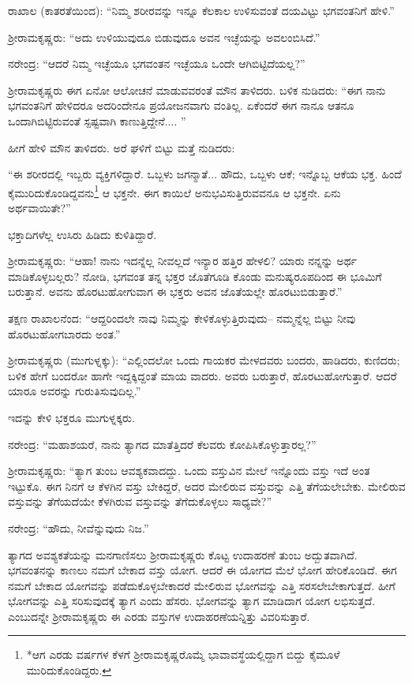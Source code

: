 ರಾಖಾಲ (ಕಾತರತೆಯಿಂದ): “ನಿಮ್ಮ ಶರೀರವನ್ನು ಇನ್ನೂ ಕೆಲಕಾಲ ಉಳಿಸುವಂತೆ ದಯವಿಟ್ಟು ಭಗವಂತನಿಗೆ ಹೇಳಿ.”

ಶ್ರೀರಾಮಕೃಷ್ಣರು: “ಅದು ಉಳಿಯುವುದೂ ಬಿಡುವುದೂ ಅವನ ಇಚ್ಛೆಯನ್ನು ಅವಲಂಬಿಸಿದೆ.”

ನರೇಂದ್ರ: “ಆದರೆ ನಿಮ್ಮ ಇಚ್ಛೆಯೂ ಭಗವಂತನ ಇಚ್ಛೆಯೂ ಒಂದೇ ಆಗಿಬಿಟ್ಟಿದೆಯಲ್ಲ?”

ಶ್ರೀರಾಮಕೃಷ್ಣರು ಈಗ ಏನೋ ಆಲೋಚನೆ ಮಾಡುವವರಂತೆ ಮೌನ ತಾಳಿದರು. ಬಳಿಕ ನುಡಿದರು: “ಈಗ ನಾನು ಭಗವಂತನಿಗೆ ಹೇಳಿದರೂ ಅದರಿಂದೇನೂ ಪ್ರಯೋಜನವಾಗು ವಂತಿಲ್ಲ. ಏಕೆಂದರೆ ಈಗ ನಾನೂ ಆತನೂ ಒಂದಾಗಿಬಿಟ್ಟಿರುವಂತೆ ಸ್ಪಷ್ಟವಾಗಿ ಕಾಣುತ್ತಿದ್ದೇನೆ.... ”

ಹೀಗೆ ಹೇಳಿ ಮೌನ ತಾಳಿದರು. ಅರೆ ಘಳಿಗೆ ಬಿಟ್ಟು ಮತ್ತೆ ನುಡಿದರು:

“ಈ ಶರೀರದಲ್ಲಿ ಇಬ್ಬರು ವ್ಯಕ್ತಿಗಳಿದ್ದಾರೆ. ಒಬ್ಬಳು ಜಗನ್ಮಾತೆ... ಹೌದು, ಒಬ್ಬಳು ಆಕೆ; ಇನ್ನೊಬ್ಬ ಆಕೆಯ ಭಕ್ತ. ಹಿಂದೆ ಕೈಮುರಿದುಕೊಂಡಿದ್ದವನು\footnote{*ಆಗ ಎರಡು ವರ್ಷಗಳ ಕೆಳಗೆ ಶ್ರೀರಾಮಕೃಷ್ಣರೊಮ್ಮೆ ಭಾವಾವಸ್ಥೆಯಲ್ಲಿದ್ದಾಗ ಬಿದ್ದು ಕೈಮೂಳೆ ಮುರಿದುಕೊಂಡಿದ್ದರು.} ಆ ಭಕ್ತನೇ. ಈಗ ಕಾಯಿಲೆ ಅನುಭವಿಸುತ್ತಿರುವವನೂ ಆ ಭಕ್ತನೇ. ಏನು ಅರ್ಥವಾಯಿತೇ?”

ಭಕ್ತಾದಿಗಳೆಲ್ಲ ಉಸಿರು ಹಿಡಿದು ಕುಳಿತಿದ್ದಾರೆ.

ಶ್ರೀರಾಮಕೃಷ್ಣರು: “ಆಹಾ! ನಾನು ಇದನ್ನೆಲ್ಲ ನೀವಲ್ಲದೆ ಇನ್ಯಾರ ಹತ್ತಿರ ಹೇಳಲಿ? ಯಾರು ನನ್ನನ್ನು ಅರ್ಥ ಮಾಡಿಕೊಳ್ಳಬಲ್ಲರು? ನೋಡಿ, ಭಗವಂತ ತನ್ನ ಭಕ್ತರ ಜೊತೆಗೂಡಿ ಕೊಂಡು ಮನುಷ್ಯರೂಪದಿಂದ ಈ ಭೂಮಿಗೆ ಬರುತ್ತಾನೆ. ಅವನು ಹೊರಟುಹೋಗುವಾಗ ಈ ಭಕ್ತರು ಅವನ ಜೊತೆಯಲ್ಲೇ ಹೊರಟುಬಿಡುತ್ತಾರೆ.”

ತಕ್ಷಣ ರಾಖಾಲನೆಂದ: “ಆದ್ದರಿಂದಲೇ ನಾವು ನಿಮ್ಮನ್ನು ಕೇಳಿಕೊಳ್ಳುತ್ತಿರುವುದು– ನಮ್ಮನ್ನೆಲ್ಲ ಬಿಟ್ಟು ನೀವು ಹೊರಟುಹೋಗಬಾರದು ಅಂತ.”

ಶ್ರೀರಾಮಕೃಷ್ಣರು (ಮುಗುಳ್ನಕ್ಕು): “ಎಲ್ಲಿಂದಲೋ ಒಂದು ಗಾಯಕರ ಮೇಳದವರು ಬಂದರು, ಹಾಡಿದರು, ಕುಣಿದರು; ಬಳಿಕ ಹೇಗೆ ಬಂದರೋ ಹಾಗೇ ಇದ್ದಕ್ಕಿದ್ದಂತೆ ಮಾಯ ವಾದರು. ಅವರು ಬರುತ್ತಾರೆ, ಹೊರಟುಹೋಗುತ್ತಾರೆ. ಆದರೆ ಯಾರೂ ಅವರನ್ನು ಗುರುತಿಸುವುದಿಲ್ಲ.”

ಇದನ್ನು ಕೇಳಿ ಭಕ್ತರೂ ಮುಗುಳ್ನಕ್ಕರು.

ನರೇಂದ್ರ: “ಮಹಾಶಯರೆ, ನಾನು ತ್ಯಾಗದ ಮಾತೆತ್ತಿದರೆ ಕೆಲವರು ಕೋಪಿಸಿಕೊಳ್ಳುತ್ತಾರಲ್ಲ?”

ಶ್ರೀರಾಮಕೃಷ್ಣರು: “ತ್ಯಾಗ ತುಂಬ ಆವಶ್ಯಕವಾದದ್ದು. ಒಂದು ವಸ್ತುವಿನ ಮೇಲೆ ಇನ್ನೊಂದು ವಸ್ತು ಇದೆ ಅಂತ ಇಟ್ಟುಕೊ. ಈಗ ನಿನಗೆ ಆ ಕೆಳಗಿನ ವಸ್ತು ಬೇಕಿದ್ದರೆ, ಅದರ ಮೇಲಿರುವ ವಸ್ತುವನ್ನು ಎತ್ತಿ ತೆಗೆಯಲೇಬೇಕು. ಮೇಲಿರುವ ವಸ್ತುವನ್ನು ತೆಗೆಯದೆಯೇ ಕೆಳಗಿರುವ ವಸ್ತುವನ್ನು ತೆಗೆದುಕೊಳ್ಳಲು ಸಾಧ್ಯವೇ?”

ನರೇಂದ್ರ: “ಹೌದು, ನೀವೆನ್ನುವುದು ನಿಜ.”

ತ್ಯಾಗದ ಅವಶ್ಯಕತೆಯನ್ನು ಮನಗಾಣಿಸಲು ಶ್ರೀರಾಮಕೃಷ್ಣರು ಕೊಟ್ಟ ಉದಾಹರಣೆ ತುಂಬ ಅದ್ಬುತವಾಗಿದೆ. ಭಗವಂತನನ್ನು ಕಾಣಲು ನಮಗೆ ಬೇಕಾದ ವಸ್ತು ಯೋಗ. ಆದರೆ ಈ ಯೋಗದ ಮೆಲೆ ಭೋಗ ಹೇರಿಕೊಂಡಿದೆ. ಈಗ ನಮಗೆ ಬೇಕಾದ ಯೋಗವನ್ನು ಪಡೆದುಕೊಳ್ಳಬೇಕಾದರೆ ಮೇಲಿರುವ ಭೋಗವನ್ನು ಎತ್ತಿ ಸರಸಲೇಬೇಕಾಗುತ್ತದೆ. ಹೀಗೆ ಭೋಗವನ್ನು ಎತ್ತಿ ಸರಿಸುವುದಕ್ಕೆ ತ್ಯಾಗ ಎಂದು ಹೆಸರು. ಭೋಗವನ್ನು ತ್ಯಾಗ ಮಾಡಿದಾಗ ಯೋಗ ಲಭಿಸುತ್ತದೆ. ಎಂಬುದನ್ನೇ ಶ್ರೀರಾಮಕೃಷ್ಣರು ಈ ಎರಡು ವಸ್ತುಗಳ ಉದಾಹರಣೆಯನ್ನಿತ್ತು ವಿವರಿಸುತ್ತಾರೆ.

